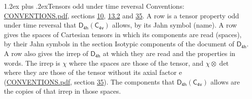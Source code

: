 \documentclass[10pt,a4paper]{article}
\makeatletter
\renewcommand\section{\@startsection{section}{1}{\z@}{-3ex plus -1ex minus -.2ex}%
  {1.2ex plus .2ex}{\normalfont\large\sffamily\bfseries\color{parttitle}}}
\numberwithin{equation}{section}
\newcommand{\grp}[1]{\mathsf{#1}}
\newcommand{\irrprod}{\otimes}
\makeatother
\begin{document}
\section{Tensors odd under time reversal}\label{s:time_odd}
Conventions: \href{../../CONVENTIONS.pdf}{CONVENTIONS.pdf}, sections \href{../../../rotation/CONVENTIONS.pdf\#conv.10}{10}, \href{../../../rotation/CONVENTIONS.pdf\#conv.13.2}{13.2} and \href{../../CONVENTIONS.pdf\#conv.35}{35}.
\leavevmode\label{n:head.name.property}A row is a tensor property odd under time reversal that $\grp{D_{4h}}(\grp{C_{4v}})$ allows, by its Jahn symbol (name). \label{n:head.spaces}A row gives the spaces of Cartesian tensors in which its components are read (spaces), by their Jahn symbols in the section Isotypic components of the document of \href{../../../rotation/data/pdf/D4h.pdf}{$\grp{D_{4h}}$}. \label{n:head.properties}A row also gives the irrep of $\grp{D_{4h}}$ at which they are read and the properties in words. The irrep is $\chi$ where the spaces are those of the tensor, and $\chi \irrprod \det$ where they are those of the tensor without its axial factor e (\href{../../CONVENTIONS.pdf}{CONVENTIONS.pdf}, section \href{../../CONVENTIONS.pdf\#conv.35}{35}). The components that $\grp{D_{4h}}(\grp{C_{4v}})$ allows are the copies of that irrep in those spaces.
\end{document}
